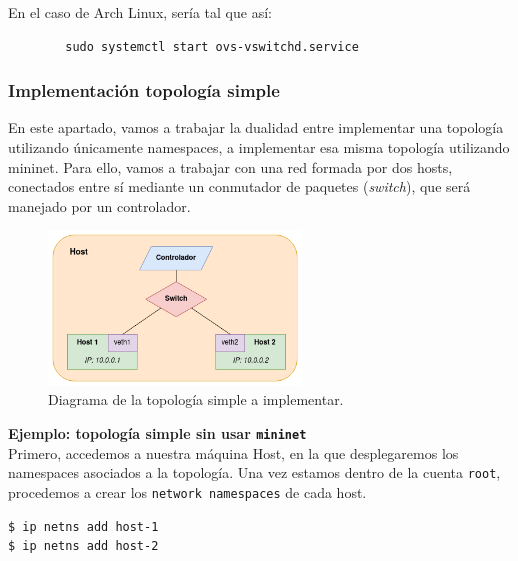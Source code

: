 \documentclass[12pt]{article}
\begin{document}
	\noindent En el caso de Arch Linux, sería tal que así:
	\begin{verbatim}
		sudo systemctl start ovs-vswitchd.service
	\end{verbatim}

	
	\pagebreak
	
	\subsubsection{Implementación topología simple}
	
	\noindent En este apartado, vamos a trabajar la dualidad entre implementar una topología utilizando únicamente namespaces, a implementar esa misma topología utilizando mininet. Para ello, vamos a trabajar con una red formada por dos hosts, conectados entre sí mediante un conmutador de paquetes (\textit{switch}), que será manejado por un controlador. \\
	
	\begin{figure}[h!]
		\begin{center}
			\includegraphics[width=0.6\textwidth]{img/ns_mn_single.png}
			\caption{Diagrama de la topología simple a implementar.}
		\end{center}
	\end{figure}
	
	\noindent \textbf{\large Ejemplo: topología simple sin usar \texttt{mininet}}\\
	
	\noindent Primero, accedemos a nuestra máquina Host, en la que desplegaremos los namespaces asociados a la topología. Una vez estamos dentro de la cuenta \texttt{root}, procedemos a crear los \texttt{network namespaces} de cada host. 
	
	\begin{verbatim}
$ ip netns add host-1
$ ip netns add host-2
	\end{verbatim}
\end{document}
